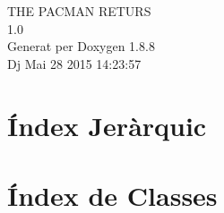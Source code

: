 \documentclass[twoside]{book}
\newcommand{\+}{\discretionary{\mbox{\scriptsize$\hookleftarrow$}}{}{}}
\newcommand{\clearemptydoublepage}{%
  \newpage{\pagestyle{empty}\cleardoublepage}%
}
\begin{document}
\hypersetup{pageanchor=false,
             bookmarks=true,
             bookmarksnumbered=true,
             pdfencoding=unicode
            }
\begin{titlepage}
\vspace*{7cm}
\begin{center}%
{\Large T\+H\+E P\+A\+C\+M\+A\+N R\+E\+T\+U\+R\+S \\[1ex]\large 1.\+0 }\\
\vspace*{1cm}
{\large Generat per Doxygen 1.8.8}\\
\vspace*{0.5cm}
{\small Dj Mai 28 2015 14:23:57}\\
\end{center}
\end{titlepage}
\clearemptydoublepage
\tableofcontents
\clearemptydoublepage
{}
\hypersetup{pageanchor=true}

\chapter{Índex Jeràrquic}

\chapter{Índex de Classes}

\end{document}
